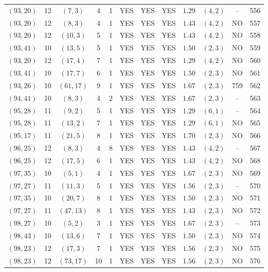 \begin{longtable}{|c|c|c|c|c|c|c|c|c|c|c|c|}
$(93,20)$ & 12 & $(7,3)$ & 4 & 1 & YES & YES & YES & $1.29$ & $(4,2)$ & -- & 556\\
$(93,20)$ & 12 & $(8,3)$ & 4 & 1 & YES & YES & YES & $1.43$ & $(4,2)$ & NO & 557\\
$(93,20)$ & 12 & $(10,3)$ & 5 & 1 & YES & YES & YES & $1.43$ & $(4,2)$ & NO & 558\\
$(93,41)$ & 10 & $(13,5)$ & 5 & 1 & YES & YES & YES & $1.50$ & $(2,3)$ & NO & 559\\
$(93,20)$ & 12 & $(17,4)$ & 7 & 1 & YES & YES & YES & $1.29$ & $(4,2)$ & NO & 560\\
$(93,41)$ & 10 & $(17,7)$ & 6 & 1 & YES & YES & YES & $1.50$ & $(2,3)$ & NO & 561\\
$(93,26)$ & 10 & $(61,17)$ & 9 & 1 & YES & YES & YES & $1.67$ & $(2,3)$ & 759 & 562\\
$(94,41)$ & 10 & $(8,3)$ & 4 & 2 & YES & YES & YES & $1.67$ & $(2,3)$ & -- & 563\\
$(95,28)$ & 11 & $(9,2)$ & 5 & 1 & YES & YES & YES & $1.29$ & $(6,1)$ & -- & 564\\
$(95,28)$ & 11 & $(13,2)$ & 7 & 1 & YES & YES & YES & $1.29$ & $(6,1)$ & NO & 565\\
$(95,17)$ & 11 & $(21,5)$ & 8 & 1 & YES & YES & YES & $1.70$ & $(2,3)$ & NO & 566\\
$(96,25)$ & 12 & $(8,3)$ & 4 & 8 & YES & YES & YES & $1.43$ & $(4,2)$ & -- & 567\\
$(96,25)$ & 12 & $(17,5)$ & 6 & 1 & YES & YES & YES & $1.43$ & $(4,2)$ & NO & 568\\
$(97,35)$ & 10 & $(5,1)$ & 4 & 1 & YES & YES & YES & $1.67$ & $(2,3)$ & NO & 569\\
$(97,27)$ & 11 & $(11,3)$ & 5 & 1 & YES & YES & YES & $1.56$ & $(2,3)$ & -- & 570\\
$(97,35)$ & 10 & $(20,7)$ & 8 & 1 & YES & YES & YES & $1.50$ & $(2,3)$ & NO & 571\\
$(97,27)$ & 11 & $(47,13)$ & 8 & 1 & YES & YES & YES & $1.43$ & $(2,3)$ & NO & 572\\
$(98,27)$ & 10 & $(5,2)$ & 3 & 1 & YES & YES & YES & $1.67$ & $(2,3)$ & -- & 573\\
$(98,43)$ & 10 & $(13,6)$ & 7 & 1 & YES & YES & YES & $1.50$ & $(2,3)$ & NO & 574\\
$(98,23)$ & 12 & $(17,3)$ & 7 & 1 & YES & YES & YES & $1.56$ & $(2,3)$ & NO & 575\\
$(98,23)$ & 12 & $(73,17)$ & 10 & 1 & YES & YES & YES & $1.56$ & $(2,3)$ & NO & 576\\

\end{longtable}
